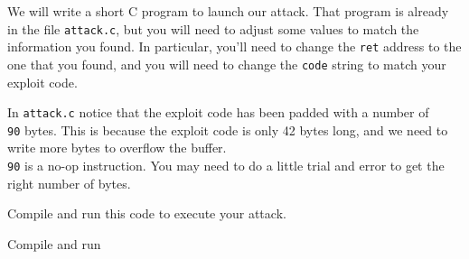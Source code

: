 \documentclass{article}
\begin{document}
We will write a short C program to launch our attack.  That program is already in the file \texttt{attack.c}, but you will need to adjust some values to match the information you found. In particular, you'll need to change the \texttt{ret} address to the one that you found, and you will need to change the \texttt{code} string to match your exploit code.

In \texttt{attack.c} notice that the exploit code has been padded with a number of \texttt{\\90} bytes. This is because the exploit code is only 42 bytes long, and we need to write more bytes to overflow the buffer.  \texttt{\\90} is a no-op instruction. You may need to do a little trial and error to get the right number of bytes.

Compile and run this code to execute your attack.

Compile and run 
\end{document}
